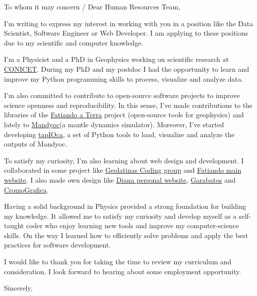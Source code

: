 \documentclass[a4paper,10pt]{letter}
\date{February 25, 2021}
\begin{document}
\begin{letter}
{To whom it may concern / Dear Human Resources Team,}
\opening{}

I'm writing to express my interest in working with you in a position like the 
Data Scientist, Software Engineer or Web Developer.
I am applying to these positions due to my scientific and computer 
knowledge. 

I'm a Physicist and a PhD in Geophysics working on scientific research at
\href{https://www.conicet.gov.ar/}{CONICET}.
During my PhD and my postdoc I had the opportunity to learn and improve my
Python programming skills to process, visualize and analyze data. 

I'm also committed to contribute to open-source software projects to improve
science openness and reproducibility.
In this sense, I've made contributions to the libraries of the
\href{https://fatiando.org}{Fatiando a Terra} project (open-source tools for
geophysics) and lately to \href{https://github.com/ggciag/mandyoc}{Mandyoc}(a 
mantle dynamics simulator).
Moreover, I've started developing 
\href{https://github.com/aguspesce/tapioca}{tapIOca}, a set of Python tools to 
load, visualize and analyze the outputs of Mandyoc.

To satisfy my curiosity, I'm also learning about web design and development.
I collaborated in some project like 
\href{https://geolatinas.github.io/}{Geolatinas Coding group} and 
\href{https://www.fatiando.org/}{Fatiando main website}. 
I also made own design like \href{https://dianaceroallard.github.io/}{Diana 
personal website}, \href{https://aguspesce.github.io/garabatos/}{Garabatos} and 
\href{https://aguspesce.github.io/web-cromografica/}{CromoGrafica}. 

Having a solid background in Physics provided a strong foundation for building 
my knowledge.
It allowed me to satisfy my curiosity and develop myself as a self-taught coder 
who enjoy learning new tools and improve my computer-science skills.
On the way I learned how to efficiently solve problems and apply the best
practices for software development.

I would like to thank you for taking the time to review my curriculum and 
consideration. 
I look forward to hearing about some employment opportunity.


\closing{Sincerely,}


\end{letter}
\end{document}

